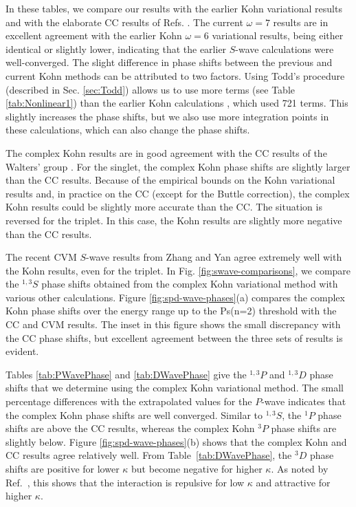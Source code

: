 \documentclass[preprint,showpacs,showkeys,preprintnumbers,amsmath,amssymb,longbibliography,pra,aps]{revtex4-1}
\begin{document}
In these tables, we compare our results with the earlier Kohn variational 
results \cite{VanReeth2003,VanReeth2004} and with the elaborate CC results of 
Refs. \cite{Blackwood2002,Walters2004}. The current $\omega = 7$ results are 
in excellent agreement with the earlier Kohn $\omega = 6$ variational 
results, being either identical or slightly lower, indicating that the 
earlier $S$-wave calculations were well-converged. The slight difference in 
phase shifts between the previous and current Kohn methods can be attributed 
to two factors. Using Todd's procedure (described in Sec. \ref{sec:Todd}) 
allows us to use more terms (see Table \ref{tab:Nonlinear1}) than the earlier 
Kohn calculations \cite{VanReeth2003,VanReeth2004}, which used 721 terms. 
This slightly increases the phase shifts, but we also use more integration 
points in these calculations, which can also change the phase shifts.

The complex Kohn results are in good agreement with the CC results of the 
Walters' group \cite{Blackwood2002,Walters2004}. For the singlet, the complex 
Kohn phase shifts are slightly larger than the CC results. Because of the 
empirical bounds on the Kohn variational results and, in practice on the CC
(except for the Buttle correction), the complex Kohn results could be slightly 
more accurate than the CC. The situation is reversed for the triplet. In this
case, the Kohn results are slightly more negative than the CC results.

The recent CVM $S$-wave results from Zhang and Yan \cite{Zhang2012} agree 
extremely well with the Kohn results, even for the triplet. In Fig.
\ref{fig:swave-comparisons},
we compare the $^{1,3}S$ phase shifts obtained from 
the complex Kohn variational method with various other calculations. Figure 
\ref{fig:spd-wave-phases}(a) compares the complex Kohn phase shifts over the 
energy range up to the Ps(n=2) threshold with the CC and CVM results. The 
inset in this figure shows the small discrepancy with the CC phase shifts, 
but excellent agreement between the three sets of results is evident. 

Tables \ref{tab:PWavePhase} and \ref{tab:DWavePhase} give the $^{1,3}P$ and
$^{1,3}D$
 phase shifts that we determine using the complex Kohn variational 
method. The small percentage differences with the extrapolated values for the 
$P$-wave indicates that the complex Kohn phase shifts are well converged.
Similar to $^{1,3}S$, the $^1P$ phase shifts are above the CC results,
whereas the complex Kohn $^3P$ phase shifts are slightly below. Figure
\ref{fig:spd-wave-phases}(b) shows that the 
complex Kohn and CC results agree relatively well.
From Table~\ref{tab:DWavePhase}, the $^3D$ phase shifts are positive for
lower $\kappa$ but become negative for higher $\kappa$. As noted by
Ref.~\cite{Blackwood2002}, this shows that the interaction is repulsive for 
low $\kappa$ and attractive for higher $\kappa$.
\end{document}

